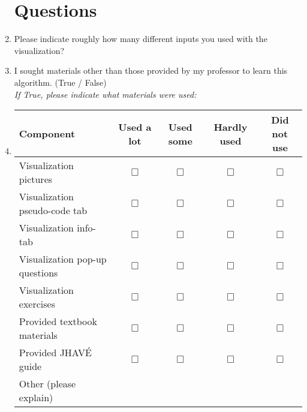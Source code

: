 \documentclass[letter]{article}
\begin{document}
\begin{enumerate}

\section*{Questions}

\item Please indicate roughly how many different inputs you used with the visualization? \underline{\hspace{1cm}}

\item I sought materials other than those provided by my professor to learn this algorithm.
(True / False) \\ \textsl{If True, please indicate what materials were used:}


\item
\begin{tabular}{| l | c | c | c | c |}
\hline
\textbf{Component} & \textbf{Used a lot} & \textbf{Used some} & \textbf{Hardly used} & \textbf{Did not use} \\
\hline
Visualization pictures & $\Box$ & $\Box$ & $\Box$ & $\Box$ \\
\hline
Visualization pseudo-code tab & $\Box$ & $\Box$ & $\Box$ & $\Box$ \\
\hline
Visualization info-tab & $\Box$ & $\Box$ & $\Box$ & $\Box$ \\
\hline
Visualization pop-up questions & $\Box$ & $\Box$ & $\Box$ & $\Box$ \\
\hline
Visualization exercises & $\Box$ & $\Box$ & $\Box$ & $\Box$ \\
\hline
Provided textbook materials & $\Box$ & $\Box$ & $\Box$ & $\Box$ \\
\hline
Provided JHAVÉ guide & $\Box$ & $\Box$ & $\Box$ & $\Box$ \\
\hline
Other (please explain) &&&&\\
\hline
\end{tabular}

\addtocounter{enumi}{7}


\end{enumerate}
\end{document}

